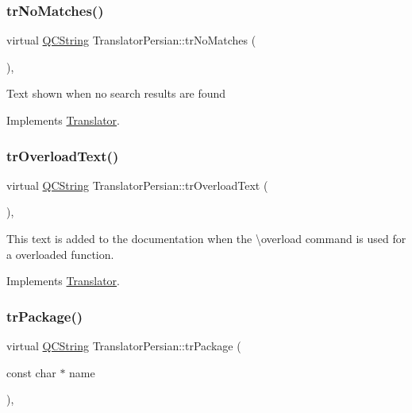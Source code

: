 \subsubsection{\texorpdfstring{trNoMatches()}{trNoMatches()}}
{\footnotesize\ttfamily virtual \mbox{\hyperlink{class_q_c_string}{Q\+C\+String}} Translator\+Persian\+::tr\+No\+Matches (\begin{DoxyParamCaption}{ }\end{DoxyParamCaption})\hspace{0.3cm}{\ttfamily [inline]}, {\ttfamily [virtual]}}

Text shown when no search results are found 

Implements \mbox{\hyperlink{class_translator}{Translator}}.

\mbox{\label{class_translator_persian_a8e0b7cf24f2cf4b77158904941cfe4f8}} 
\subsubsection{\texorpdfstring{trOverloadText()}{trOverloadText()}}
{\footnotesize\ttfamily virtual \mbox{\hyperlink{class_q_c_string}{Q\+C\+String}} Translator\+Persian\+::tr\+Overload\+Text (\begin{DoxyParamCaption}{ }\end{DoxyParamCaption})\hspace{0.3cm}{\ttfamily [inline]}, {\ttfamily [virtual]}}

This text is added to the documentation when the \textbackslash{}overload command is used for a overloaded function. 

Implements \mbox{\hyperlink{class_translator}{Translator}}.

\mbox{\label{class_translator_persian_aeb04cef2e2dd44848d1a12987f6df7e5}} 
\subsubsection{\texorpdfstring{trPackage()}{trPackage()}}
{\footnotesize\ttfamily virtual \mbox{\hyperlink{class_q_c_string}{Q\+C\+String}} Translator\+Persian\+::tr\+Package (\begin{DoxyParamCaption}\item[{const char $\ast$}]{name }\end{DoxyParamCaption})\hspace{0.3cm}{\ttfamily [inline]}, {\ttfamily [virtual]}}

